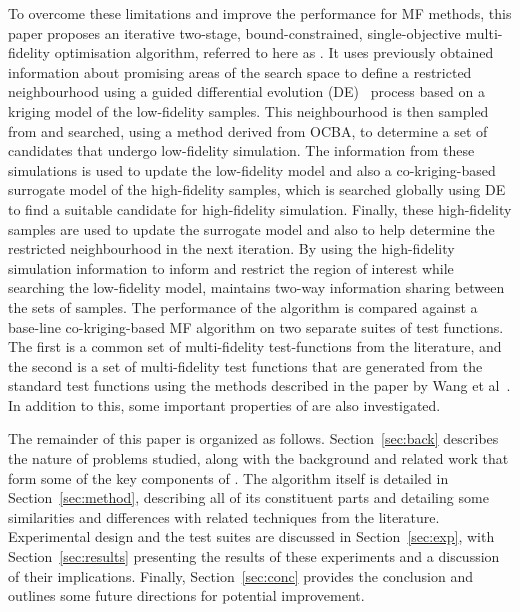 To overcome these limitations and improve the performance for MF methods, this paper proposes an iterative two-stage, bound-constrained, single-objective multi-fidelity optimisation algorithm, referred to here as \AlgName{}. It uses previously obtained information about promising areas of the search space to define a restricted neighbourhood using a guided differential evolution (DE)~\cite{storn1997differential} process based on a kriging model of the low-fidelity samples. This neighbourhood is then sampled from and searched, using a method derived from OCBA, to determine a set of candidates that undergo low-fidelity simulation. The information from these simulations is used to update the low-fidelity model and also a co-kriging-based surrogate model of the high-fidelity samples, which is searched globally using DE to find a suitable candidate for high-fidelity simulation. Finally, these high-fidelity samples are used to update the surrogate model and also to help determine the restricted neighbourhood in the next iteration. By using the high-fidelity simulation information to inform and restrict the region of interest while searching the low-fidelity model, \AlgName{} maintains two-way information sharing between the sets of samples. The performance of the \AlgName{} algorithm is compared against a base-line co-kriging-based MF algorithm on two separate suites of test functions. The first is a common set of multi-fidelity test-functions from the literature, and the second is a set of multi-fidelity test functions that are generated from the standard test functions using the methods described in the paper by Wang et al~\cite{wang2017generic}. In addition to this, some important properties of \AlgName{} are also investigated.

The remainder of this paper is organized as follows. Section~\ref{sec:back} describes the nature of problems studied, along with the background and related work that form some of the key components of \AlgName{}. The algorithm itself is detailed in Section~\ref{sec:method}, describing all of its constituent parts and detailing some similarities and differences with related techniques from the literature. Experimental design and the test suites are discussed in Section~\ref{sec:exp}, with Section~\ref{sec:results} presenting the results of these experiments and a discussion of their implications. Finally, Section~\ref{sec:conc} provides the conclusion and outlines some future directions for potential improvement.
